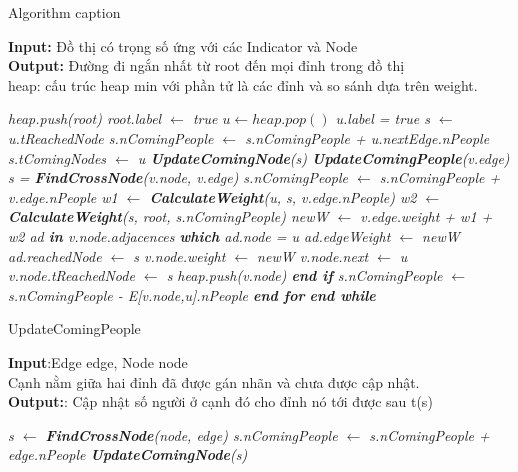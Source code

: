     \begin{algorithm}
    \caption{Algorithm caption}
    \label{alg:algorithm-label}
    \textbf{Input:} Đồ thị có trọng số ứng với các Indicator và Node\\
    \textbf{Output:} Đường đi ngắn nhất từ root đến mọi đỉnh trong đồ thị\\
    heap: cấu trúc heap min với phần tử là các đỉnh và so sánh dựa 
    trên weight.
    \begin{algorithmic}[1]
        \em
        \State heap.push(root)
        \State root.label $\gets$ true
        \State $u \gets heap.pop()$
        \State u.label = true
        \State s $\gets$ u.tReachedNode
        \State s.nComingPeople $\gets$ s.nComingPeople + u.nextEdge.nPeople
        \State s.tComingNodes $\gets$ u
        \State \textbf{UpdateComingNode}(s)
        \State \textbf{UpdateComingPeople}(v.edge)
        \EndFor
        \State s = \textbf{FindCrossNode}(v.node, v.edge)
        \State s.nComingPeople $\gets$ s.nComingPeople + v.edge.nPeople
        \State w1 $\gets$ \textbf{CalculateWeight}(u, s, v.edge.nPeople)
        \State w2 $\gets$ \textbf{CalculateWeight}(s, root, s.nComingPeople)
        \State newW $\gets$ v.edge.weight + w1 + w2
        \State ad \textbf{in} v.node.adjacences \textbf{which} ad.node = u
        \State ad.edgeWeight $\gets$ newW
        \State ad.reachedNode $\gets$ s
        \State v.node.weight $\gets$ newW
        \State v.node.next $\gets$ u 
        \State v.node.tReachedNode $\gets$ s
        \State heap.push(v.node)
        \EndIf
        \State \textbf{end if}
        \State s.nComingPeople $\gets$ s.nComingPeople - E[v.node,u].nPeople
        \EndFor
        \textbf{end for}
        \EndWhile
        \textbf{end while}
    \EndProcedure
    \end{algorithmic}
    \end{algorithm}

    \begin{algorithm}
        \caption{UpdateComingPeople}
        \textbf{Input}:Edge edge, Node node \\ 
        Cạnh nằm giữa hai đỉnh đã được gán nhãn và chưa được cập nhật. \\
        \textbf{Output:}: Cập nhật số người ở cạnh đó cho đỉnh nó tới được sau t(s)

        \begin{algorithmic}
            \em
            \State s $\gets$ \textbf{FindCrossNode}(node, edge)
            \State s.nComingPeople $\gets$ s.nComingPeople + edge.nPeople
            \State \textbf{UpdateComingNode}(s)
            \EndProcedure
        \end{algorithmic}
    \end{algorithm}
    
